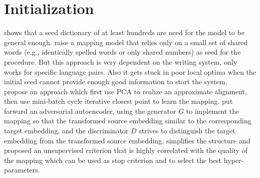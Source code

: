 \section{Initialization}
 \cite{vulic2016role} shows that a seed dictionary of at least hundreds are need for the model to be general enough. \cite{artetxe2017learning} raise a mapping model that relies only on a small set of shared words (e.g., identically spelled words or only shared numbers) as seed for the procedure. But this approach is very dependent on the writing system, only works for specific language pairs. Also it gets stuck in poor local optima when the initial seed cannot provide enough good information to start the system.\\
  \cite{DBLP:journals/corr/abs-1801-06126}
 propose an approach which first use PCA to realize an approximate alignment, then use mini-batch cycle iterative closest point to learn the mapping.  
\cite{zhang2017adversarial} put forward an adversarial autoencoder, using the generator $G$ to implement the mapping so that the transformed source embedding similar to the corresponding target embedding, and the discriminator $D$ strives to distinguish the target embedding from the transformed source embedding. \cite{conneau2017word} simplifies the structure and proposed an unsupervised criterion that is highly correlated with the quality of the mapping which can be used as stop criterion and to select the best hyper-parameters.
%
%
%
%

